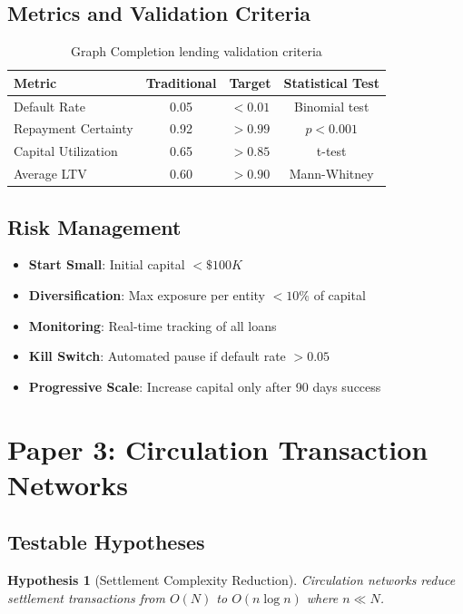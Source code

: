 \documentclass[12pt]{article}
\newtheorem{hypothesis}{Hypothesis}
\begin{document}
\subsection{Metrics and Validation Criteria}

\begin{table}[h]
\centering
\begin{tabular}{|l|c|c|c|}
\hline
Metric & Traditional & Target & Statistical Test \\
\hline
Default Rate & 0.05 & $< 0.01$ & Binomial test \\
Repayment Certainty & 0.92 & $> 0.99$ & $p < 0.001$ \\
Capital Utilization & 0.65 & $> 0.85$ & t-test \\
Average LTV & 0.60 & $> 0.90$ & Mann-Whitney \\
\hline
\end{tabular}
\caption{Graph Completion lending validation criteria}
\end{table}

\subsection{Risk Management}

\begin{itemize}
    \item \textbf{Start Small}: Initial capital $< \$100K$
    \item \textbf{Diversification}: Max exposure per entity $< 10\%$ of capital
    \item \textbf{Monitoring}: Real-time tracking of all loans
    \item \textbf{Kill Switch}: Automated pause if default rate $> 0.05$
    \item \textbf{Progressive Scale}: Increase capital only after 90 days success
\end{itemize}

\section{Paper 3: Circulation Transaction Networks}

\subsection{Testable Hypotheses}

\begin{hypothesis}[Settlement Complexity Reduction]
Circulation networks reduce settlement transactions from $O(N)$ to $O(n \log n)$ where $n \ll N$.
\end{hypothesis}
\end{document}
